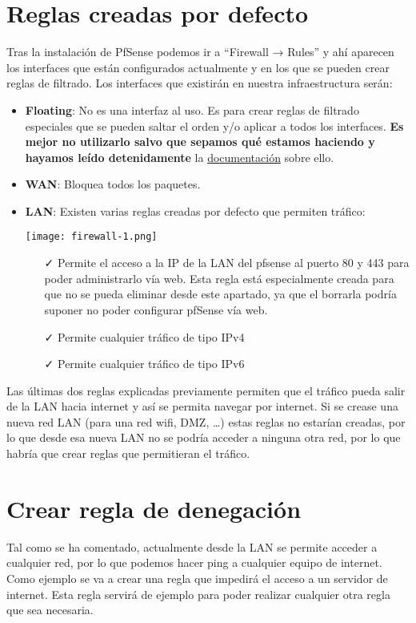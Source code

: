 \section{Reglas creadas por defecto}
Tras la instalación de PfSense podemos ir a “Firewall → Rules” y ahí aparecen los interfaces que están configurados actualmente y en los que se pueden crear reglas de filtrado. Los interfaces que existirán en nuestra infraestructura serán:

\begin{itemize}
    \item \textbf{Floating}: No es una interfaz al uso. Es para crear reglas de filtrado especiales que se pueden saltar el orden y/o aplicar a todos los interfaces. \textbf{Es mejor no utilizarlo salvo que sepamos qué estamos haciendo y hayamos leído detenidamente} la \href{https://docs.netgate.com/pfsense/en/latest/firewall/floating-rules.html}{documentación} sobre ello.
    \item \textbf{WAN}: Bloquea todos los paquetes.
    \item \textbf{LAN}: Existen varias reglas creadas por defecto que permiten tráfico:

    \begin{center}
        \texttt{[image: firewall-1.png]}
    \end{center}

    \begin{enumerate}
        \item[\faCheck] Permite el acceso a la IP de la LAN del pfsense al puerto 80 y 443 para poder administrarlo vía web. Esta regla está especialmente creada para que no se pueda eliminar desde este apartado, ya que el borrarla podría suponer no poder configurar pfSense vía web.
        \item[\faCheck] Permite cualquier tráfico de tipo IPv4
        \item[\faCheck] Permite cualquier tráfico de tipo IPv6
    \end{enumerate}
\end{itemize}

Las últimas dos reglas explicadas previamente permiten que el tráfico pueda salir de la LAN hacia internet y así se permita navegar por internet. Si se crease una nueva red LAN (para una red wifi, DMZ, …) estas reglas no estarían creadas, por lo que desde esa nueva LAN no se podría acceder a ninguna otra red, por lo que habría que crear reglas que permitieran el tráfico.

\section{Crear regla de denegación}
Tal como se ha comentado, actualmente desde la LAN se permite acceder a cualquier red, por lo que podemos hacer ping a cualquier equipo de internet. Como ejemplo se va a crear una regla que impedirá el acceso a un servidor de internet. Esta regla servirá de ejemplo para poder realizar cualquier otra regla que sea necesaria.

